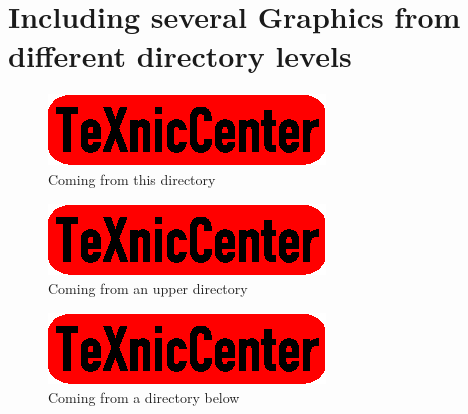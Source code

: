 %

%
%
%
%


\chapter{Including several Graphics from different directory levels}

\begin{figure}
	\begin{center}
		\includegraphics{txc.eps}
	\end{center}
	\caption{Coming from this directory}
	\label{fig:txc}
\end{figure}

\begin{figure}
	\begin{center}
		\includegraphics{../txc.eps}
	\end{center}
	\caption{Coming from an upper directory}
	\label{fig:txcup}
\end{figure}

\begin{figure}
	\begin{center}
		\includegraphics{Down/txc.eps}
	\end{center}
	\caption{Coming from a directory below}
	\label{fig:txcdown}
\end{figure}


